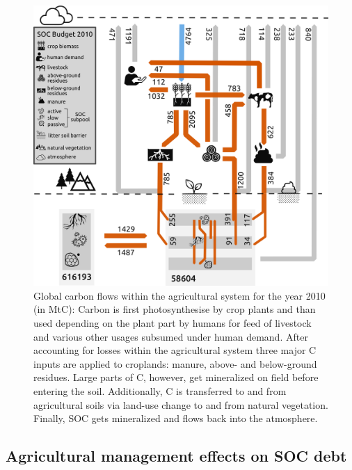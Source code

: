 \documentclass[gc, manuscript]{copernicus}
\begin{document}
\begin{figure}[h]
\includegraphics[width=16cm]{../ResultNotebooks/Output/Images/CarbonBudget} \caption{Global carbon flows within the agricultural system for the year 2010 (in MtC): Carbon is first photosynthesise by crop plants and than used depending on the plant part by humans for feed of livestock and various other usages subsumed under human demand. After accounting for losses within the agricultural system three major C inputs are applied to croplands: manure, above- and below-ground residues. Large parts of C, however, get mineralized on field before entering the soil. Additionally, C is transferred to and from agricultural soils via land-use change to and from natural vegetation. Finally, SOC gets mineralized and flows back into the atmosphere.}\label{fig:FlowFig}
\end{figure}

\hypertarget{agricultural-management-effects-on-soc-debt}{%
\subsection{Agricultural management effects on SOC debt}\label{agricultural-management-effects-on-soc-debt}}
\end{document}
